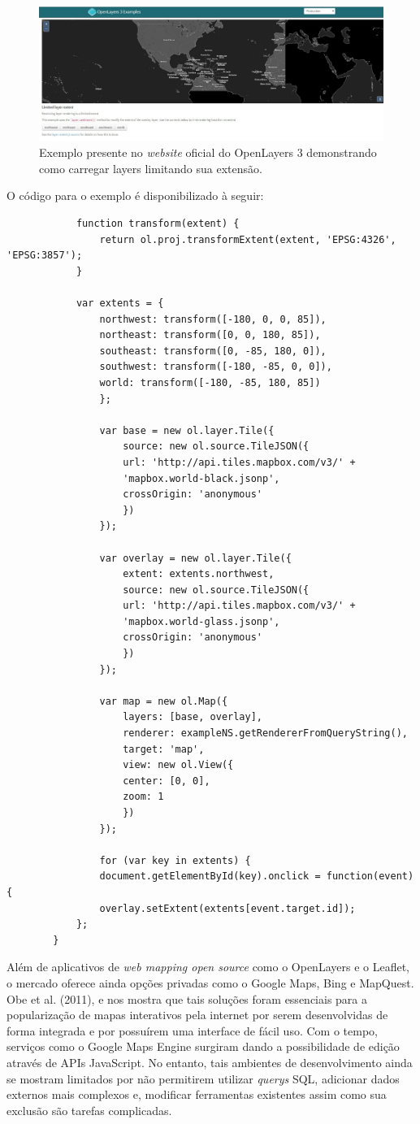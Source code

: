 		\begin{figure}
			\centering
			\includegraphics[width=1\linewidth]{data/openlayers}
			\caption{Exemplo presente no \textit{website} oficial do OpenLayers 3 demonstrando como carregar layers limitando sua extensão.}
			\label{fig:openlayers}
		\end{figure}
		
		O código para o exemplo é disponibilizado à seguir: 
		
		\begin{lstlisting}
			function transform(extent) {
				return ol.proj.transformExtent(extent, 'EPSG:4326', 'EPSG:3857');
			}
			
			var extents = {
				northwest: transform([-180, 0, 0, 85]),
				northeast: transform([0, 0, 180, 85]),
				southeast: transform([0, -85, 180, 0]),
				southwest: transform([-180, -85, 0, 0]),
				world: transform([-180, -85, 180, 85])
				};
				
				var base = new ol.layer.Tile({
					source: new ol.source.TileJSON({
					url: 'http://api.tiles.mapbox.com/v3/' +
					'mapbox.world-black.jsonp',
					crossOrigin: 'anonymous'
					})
				});
				
				var overlay = new ol.layer.Tile({
					extent: extents.northwest,
					source: new ol.source.TileJSON({
					url: 'http://api.tiles.mapbox.com/v3/' +
					'mapbox.world-glass.jsonp',
					crossOrigin: 'anonymous'
					})
				});
				
				var map = new ol.Map({
					layers: [base, overlay],
					renderer: exampleNS.getRendererFromQueryString(),
					target: 'map',
					view: new ol.View({
					center: [0, 0],
					zoom: 1
					})
				});
				
				for (var key in extents) {
				document.getElementById(key).onclick = function(event) {
				overlay.setExtent(extents[event.target.id]);
			};
		}
		\end{lstlisting}
		
		Além de aplicativos de \textit{web mapping open source} como o OpenLayers e o Leaflet, o mercado oferece ainda opções privadas como o Google Maps, Bing e MapQuest. Obe et al. (2011)\cite{OBE_etal11}, e nos mostra que tais soluções foram essenciais para a popularização de mapas interativos pela internet por serem desenvolvidas de forma integrada e por possuírem uma interface de fácil uso. Com o tempo, serviços como o Google Maps Engine surgiram dando a possibilidade de edição através de APIs JavaScript. No entanto, tais ambientes de desenvolvimento ainda se mostram limitados por não permitirem utilizar \textit{querys} SQL, adicionar dados externos mais complexos e, modificar ferramentas existentes assim como sua exclusão são tarefas complicadas. 
		
		